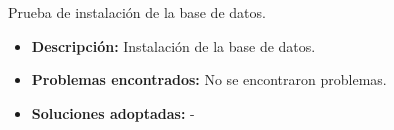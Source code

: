 \item Prueba de instalación de la base de datos.
  \begin{itemize}
    \item \textbf{Descripción:} Instalación de la base de datos.
    \item \textbf{Problemas encontrados:} No se encontraron problemas.
    \item \textbf{Soluciones adoptadas:} -
  \end{itemize}

